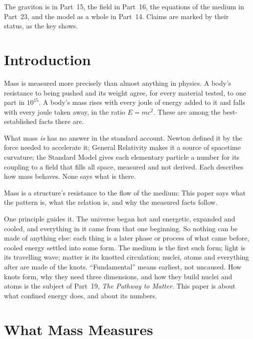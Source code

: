 \documentclass[11pt,a4paper]{article}
\begin{document}
The graviton is in Part~15, the field in Part~16, the equations of the medium in Part~23, and the model as a whole in Part~14. Claims are marked by their status, as the key shows.

\statuskey

\section*{Introduction}

Mass is measured more precisely than almost anything in physics. A body's resistance to being pushed and its weight agree, for every material tested, to one part in $10^{15}$. A body's mass rises with every joule of energy added to it and falls with every joule taken away, in the ratio $E = mc^2$. These are among the best-established facts there are.

What mass \emph{is} has no answer in the standard account. Newton defined it by the force needed to accelerate it; General Relativity makes it a source of spacetime curvature; the Standard Model gives each elementary particle a number for its coupling to a field that fills all space, measured and not derived. Each describes how mass behaves. None says what is there.

Mass is a structure's resistance to the flow of the medium:  This paper says what the pattern is, what the relation is, and why the measured facts follow.

One principle guides it. The universe began hot and energetic, expanded and cooled, and everything in it came from that one beginning. So nothing can be made of anything else: each thing is a later phase or process of what came before, cooled energy settled into some form. The medium is the first such form; light is its travelling wave; matter is its knotted circulation; nuclei, atoms and everything after are made of the knots. ``Fundamental'' means earliest, not uncaused. How knots form, why they need three dimensions, and how they build nuclei and atoms is the subject of Part~19, \emph{The Pathway to Matter}. This paper is about what confined energy does, and about its numbers.

\section{What Mass Measures}
\label{sec:measures}
\end{document}
